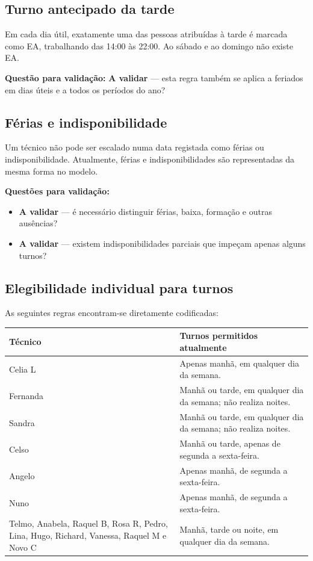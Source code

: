 \documentclass[11pt,a4paper]{article}
\newcommand{\validar}{\textcolor{blue!70!black}{\textbf{A validar}}}
\begin{document}
\subsection{Turno antecipado da tarde}

Em cada dia útil, exatamente uma das pessoas atribuídas à tarde é marcada como
EA, trabalhando das 14:00 às 22:00. Ao sábado e ao domingo não existe EA.

\textbf{Questão para validação:} \validar{} --- esta regra também se aplica a
feriados em dias úteis e a todos os períodos do ano?

\subsection{Férias e indisponibilidade}

Um técnico não pode ser escalado numa data registada como férias ou
indisponibilidade. Atualmente, férias e indisponibilidades são representadas da
mesma forma no modelo.

\textbf{Questões para validação:}
\begin{itemize}
    \item \validar{} --- é necessário distinguir férias, baixa, formação e outras ausências?
    \item \validar{} --- existem indisponibilidades parciais que impeçam apenas alguns turnos?
\end{itemize}

\subsection{Elegibilidade individual para turnos}

As seguintes regras encontram-se diretamente codificadas:

\begin{longtable}{>{\raggedright\arraybackslash}p{}
                  >{\raggedright\arraybackslash}p{}}
\toprule
\textbf{Técnico} & \textbf{Turnos permitidos atualmente} \\
\midrule
\endhead
Celia L & Apenas manhã, em qualquer dia da semana. \\
Fernanda & Manhã ou tarde, em qualquer dia da semana; não realiza noites. \\
Sandra & Manhã ou tarde, em qualquer dia da semana; não realiza noites. \\
Celso & Manhã ou tarde, apenas de segunda a sexta-feira. \\
Angelo & Apenas manhã, de segunda a sexta-feira. \\
Nuno & Apenas manhã, de segunda a sexta-feira. \\
Telmo, Anabela, Raquel B, Rosa R, Pedro, Lina, Hugo, Richard, Vanessa, Raquel M e Novo C
& Manhã, tarde ou noite, em qualquer dia da semana. \\
\bottomrule
\end{longtable}
\end{document}

